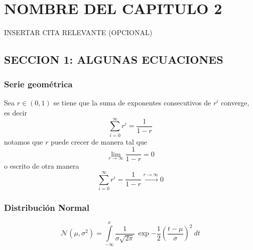 \cleardoublepage
\thispagestyle{empty}
\hbox{ }
\cleardoublepage

\chapter{NOMBRE DEL CAPITULO 2}\label{cap2}

\begin{flushright}
INSERTAR CITA RELEVANTE (OPCIONAL)
\end{flushright}
 
\section{SECCION 1: ALGUNAS ECUACIONES}

\subsection{Serie geom\'etrica}

Sea $r\in (0,1)$ se tiene que la suma de exponentes consecutivos de $r^i$ converge, es decir
\begin{equation}
\sum_{i=0}^{\infty} r^i = \frac{1}{1-r}
\end{equation}
notamos que $r$ puede crecer de manera tal que
$$
\lim_{r\to \infty} \frac{1}{1-r} = 0
$$
o escrito de otra manera
$$
\sum_{i=0}^{\infty} r^i = \frac{1}{1-r} \stackrel{r\to \infty}{\longrightarrow} 0
$$

\subsection{Distribuci\'on Normal}

\begin{equation}
\mathcal{N}(\mu,\sigma^2) = \int\limits_{-\infty}^{x} \frac1{\sigma\sqrt{2\pi}}\: \exp{-\frac{1}{2}\left(\frac{t-\mu}{\sigma}\right)^2}\: dt
\end{equation}